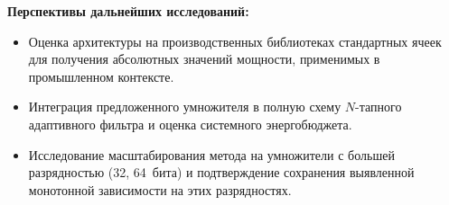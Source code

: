 \documentclass[a4paper, 12pt, oneside]{report}
\begin{document}
\textbf{Перспективы дальнейших исследований:}
\begin{itemize}
  \item Оценка архитектуры на производственных библиотеках стандартных
        ячеек для получения абсолютных значений
        мощности, применимых в промышленном контексте.
  \item Интеграция предложенного умножителя в полную схему
        $N$-тапного адаптивного фильтра и оценка системного
        энергобюджета.
  \item Исследование масштабирования метода на умножители с большей
        разрядностью (32, 64~бита) и подтверждение сохранения
        выявленной монотонной зависимости на этих разрядностях.
\end{itemize}

\end{document}
